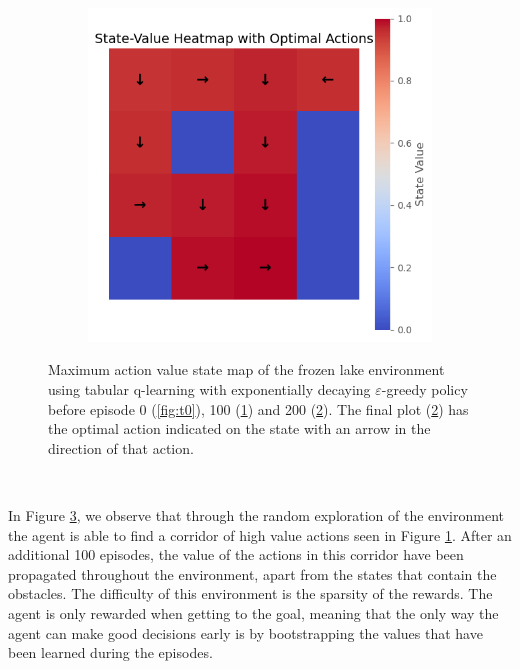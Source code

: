 \documentclass{article}
\begin{document}
\begin{figure}[htp]
\begin{subfigure}{0.3\textwidth}
        \caption{}
        \label{fig:t100}
    \end{subfigure}
    \hfill
    \begin{subfigure}{0.3\textwidth}
        \centering
        \includegraphics[width=\linewidth]{images/frozen_with_actions.png}
        \caption{}
        \label{fig:t200}
    \end{subfigure}
    
    \caption{Maximum action value state map of the frozen lake environment using tabular q-learning with exponentially decaying $\varepsilon$-greedy policy before episode 0 (\ref{fig:t0}), 100 (\ref{fig:t100}) and 200 (\ref{fig:t200}). The final plot (\ref{fig:t200}) has the optimal action indicated on the state with an arrow in the direction of that action. }
    \label{fig:frozen_lake_q_learning}
\end{figure}

\

In Figure \ref{fig:frozen_lake_q_learning}, we observe that through the random exploration of the environment the agent is able to find a corridor of high value actions seen in Figure \ref{fig:t100}. After an additional 100 episodes, the value of the actions in this corridor have been propagated throughout the environment, apart from the states that contain the obstacles. The difficulty of this environment is the sparsity of the rewards. The agent is only rewarded when getting to the goal, meaning that the only way the agent can make good decisions early is by bootstrapping the values that have been learned during the episodes. 
\end{document}

